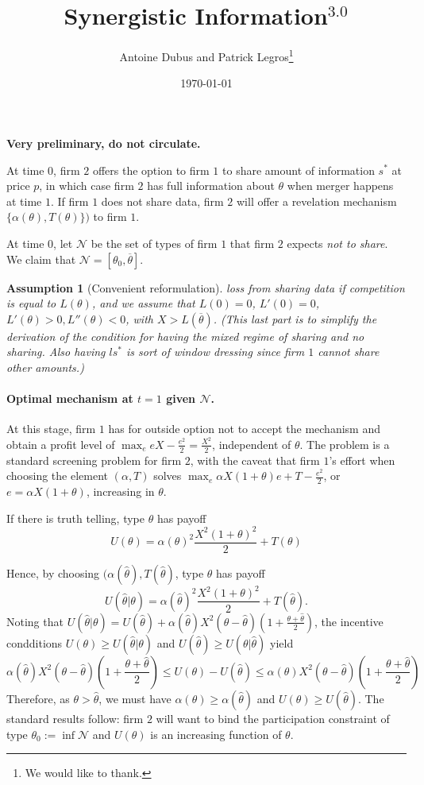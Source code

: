 \documentclass[a4paper]{article}
\newtheorem{ass}{Assumption}
\newcommand{\N}{\mathcal N}
\renewcommand{\th}{\hat\theta}
\renewcommand{\t}{\theta}
\renewcommand{\a}{\alpha}
\begin{document}
\title{Synergistic Information$^{3.0}$}
\author{Antoine Dubus and Patrick Legros\thanks{We would like to thank.}}
\date{\today}


\maketitle

 
\textbf{Very preliminary, do not circulate.}

\baselineskip0.7cm


At time $0$, firm $2$ offers the option to firm $1$ to share amount of information $s^*$ at price $p$, in which case firm $2$ has full information about $\t$ when merger happens at time $1$. If firm $1$ does not share data, firm $2$ will offer a revelation mechanism $\{\alpha(\t),T(\t)\})$ to firm $1$.

At time $0$, let $\N$ be the set of types of firm $1$ that firm $2$ expects \emph{not to share}. We claim that $\N=[\t_0,\overline \t]$.

\begin{ass}[Convenient reformulation]\label{ass:L} loss from sharing data if competition is equal to $L(\t)$, and we assume that $L(0)=0$, $L'(0)=0$, $L'(\t)>0,L''(\t)<0$, with $X>L(\overline \t)$. (This last part is to simplify the derivation of the condition for having the mixed regime of sharing and no sharing. Also having $l s^*$ is sort of window dressing since firm $1$ cannot share other amounts.)
\end{ass}
 
\paragraph{Optimal mechanism at $t=1$ given $\N$.} At this stage, firm $1$ has for outside option not to accept the mechanism and obtain a profit level of $\max_e eX -\frac{e^2}{2}=\frac{X^2}{2}$, independent of $\t$. The problem is a standard screening problem for firm $2$, with the caveat that firm $1$'s effort when choosing the element $(\alpha,T)$ solves $\max_e  \alpha X(1+\t) e +T-\frac{e^2}{2}$, or $e=\a X(1+\t)$, increasing in $\t$. 

If there is truth telling, type $\t$ has payoff
%
\[
U(\t)=\alpha(\t)^2 \frac{X^2(1+\t)^2}{2}+T(\t)
\]
%

Hence, by choosing $(\alpha(\th),T(\th)$, type $\t$ has payoff
%
\[
U(\th|\t)=\alpha(\th)^2 \frac{X^2(1+\t)^2}{2}+T(\th).
\]
%
Noting that $U(\th|\t)=U(\th)+\a(\th)X^2(\t-\th)\left(1+\frac{\t+\th}{2}\right)$, the incentive condditions $U(\t)\geq U(\th|\t)$ and $U(\th)\geq U(\t|\th)$ yield
%
\[
\a(\hat \t) X^2(\t-\th)\left(1+\frac{\t+\th}{2}\right)   \leq U(\t)-U(\th) \leq \a(\t)X^2(\t-\th)\left(1+\frac{\t+\th}{2}\right) 
\]
%
Therefore, as $\t>\th$, we must have $\a(\t)\geq \a(\th)$ and $U(\t)\geq U(\th)$.  The standard results follow: firm $2$ will want to bind the participation constraint of type $\t_0:=\inf \N$ and $U(\t)$ is an increasing function of $\t$.
\end{document}
